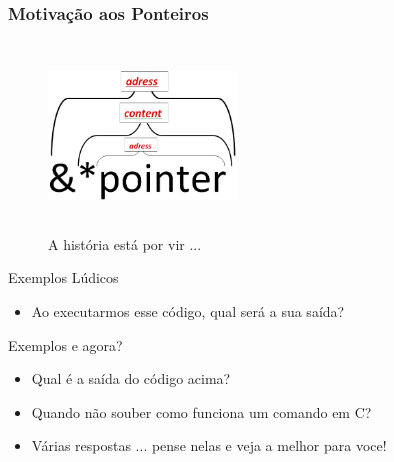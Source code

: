 \begin{frame}[allowframebreaks=0.9]

\frametitle{Motivação aos Ponteiros}
\begin{figure}[ht]
  \begin{center}

\includegraphics[height=5cm, width=5cm]{figs/fig_ponteiros/hierarq_pointer.png}

    \caption{A história está por vir ...}
  \end{center}
\end{figure}

\end{frame}


\begin{frame}{Exemplos Lúdicos}


\pause

\begin{itemize}
  \item Ao executarmos esse código, qual será a sua saída?
\end{itemize}
\end{frame}



\begin{frame}{Exemplos e agora?}


\pause



\pause
\begin{itemize}
  \item Qual é a saída do código acima? 
  \item Quando não souber como funciona um comando em C?
  \item Várias respostas ... pense nelas e veja a melhor para voce!

\end{itemize}
\end{frame}


